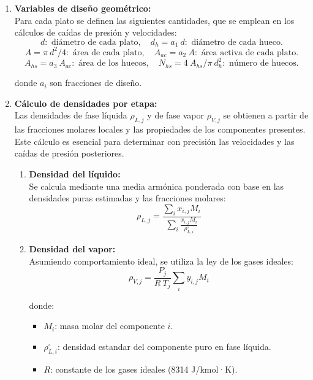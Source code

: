 \begin{enumerate}
    \item \textbf{Variables de diseño geométrico:}\\
          Para cada plato se definen las siguientes cantidades, que se emplean en los cálculos de caídas de presión y velocidades:
          $$
              d:\text{ diámetro de cada plato}, \quad
              d_h = a_1\ d:\text{ diámetro de cada hueco}.
          $$
          $$
              A = \pi\ d^2 / 4:\text{ área de cada plato}, \quad
              A_{ac} = a_2\ A:\text{ área activa de cada plato}.
          $$
          $$
              A_{hs}=a_3\ A_{ac}:\text{ área de los huecos}, \quad
              N_{hs}=4\ A_{hs} / \pi\ d_h^{2}:\text{ número de huecos}.
          $$


          donde $a_i$ son fracciones de diseño.
    \item \textbf{Cálculo de densidades por etapa:}\\
          Las densidades de fase líquida $\rho_{L,j}$ y de fase vapor $\rho_{V,j}$ se obtienen a partir de las fracciones molares locales y las propiedades de los componentes presentes. Este cálculo es esencial para determinar con precisión las velocidades y las caídas de presión posteriores.
          \begin{enumerate}
              \item \textbf{Densidad del líquido:}\\
                    Se calcula mediante una media armónica ponderada con base en las densidades puras estimadas y las fracciones molares:
                    $$
                        \rho_{L,j} = \frac{\sum_i x_{i,j} M_{i}}{\sum_i \frac{x_{i,j} M_{i}}{\rho_{L,i}^{\circ}}}
                    $$
              \item \textbf{Densidad del vapor:}\\
                    Asumiendo comportamiento ideal, se utiliza la ley de los gases ideales:
                    $$
                        \rho_{V,j} = \frac{P_j}{R\ T_j}\sum_i y_{i,j} M_i
                    $$

                    donde:
                    \begin{itemize}
                        \item $M_i$: masa molar del componente $i$.
                        \item $\rho_{L,i}^{\circ}$: densidad estandar del componente puro en fase líquida.
                        \item $R$: constante de los gases ideales (8314 J/kmol·K).
                    \end{itemize}
          \end{enumerate}


\end{enumerate}
